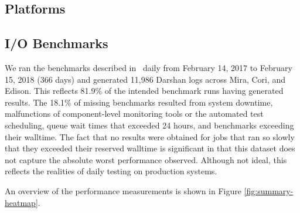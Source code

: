 
\subsection{Platforms}


\subsection{I/O Benchmarks}

We ran the benchmarks described in~\cite{Lockwood2017} daily from February 14, 2017 to February 15, 2018 (366 days) and generated 11,986 Darshan logs across Mira, Cori, and Edison.  This reflects 81.9\% of the intended benchmark runs having generated results.
The 18.1\% of missing benchmarks resulted from system downtime, malfunctions of component-level monitoring tools or the automated test scheduling, queue wait times that exceeded 24 hours, and benchmarks exceeding their walltime.
The fact that no results were obtained for jobs that ran so slowly that they exceeded their reserved walltime is significant in that this dataset does not capture the absolute worst performance observed.
Although not ideal, this reflects the realities of daily testing on production systems.

An overview of the performance measurements is shown in Figure \ref{fig:summary-heatmap}.


